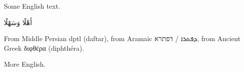 \documentclass[12pt]{article}
\begin{document}
Some English text.

أَهْلًا وَسَهْلًا

From Middle Persian dptl (daftar), from Aramaic דפתרא‎ / ܕܦܬܪܐ‎, from Ancient Greek διφθέρα (diphthéra).

More English.
\end{document}
